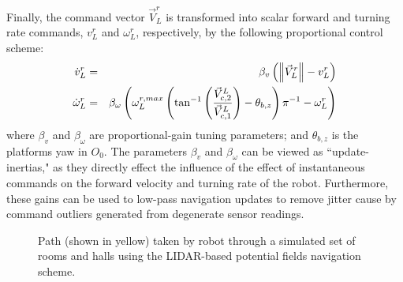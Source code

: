 Finally, the command vector $\vec{V}_{L}^{r}$ is transformed into scalar forward and turning rate commands, ${v}_{L}^{r}$ and $\omega_{L}^{r}$, respectively, by the following proportional control scheme:
	\begin{eqnarray}
	\dot{v}_{L}^{r} 		&=& \beta_{v} \left( \left\lVert \vec{V}_{L}^{r} \right\rVert - v_{L}^{r} \right) \nonumber \\
	\dot{\omega}_{L}^{r} 	&=& \beta_{\omega} \left(  \omega_{L}^{r,max} \left( { \tan^{-1}\left( \frac{\vec{V}_{c,2}^{L}}{\vec{V}_{c,1}^{L}} \right) } - \theta_{b,z} \right){\pi}^{-1} - \omega_{L}^{r} \right)
	\end{eqnarray}
where $\beta_{v}$ and $\beta_{\omega}$ are proportional-gain tuning parameters; and $\theta_{b,z}$ is the platforms yaw in $O_{0}$. The parameters $\beta_{v}$ and $\beta_{\omega}$ can be viewed as ``update-inertias," as they directly effect the influence of the effect of instantaneous commands on the forward velocity and turning rate of the robot. Furthermore, these gains can be used to low-pass navigation updates to remove jitter cause by command outliers generated from degenerate sensor readings.
				\begin{figure}[t!]
					\centering
					\caption{Path (shown in yellow) taken by robot through a simulated set of rooms and halls using the LIDAR-based potential fields navigation scheme.}
					\label{fig::potential_field_results}
				\end{figure}

